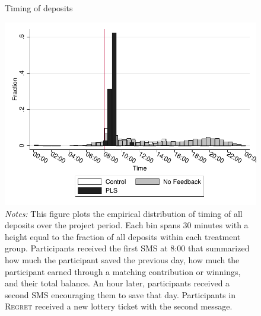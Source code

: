 \documentclass[11pt]{article}
\begin{document}
        \begin{figure}[ht]
        \centering
        \caption{Timing of deposits}
        \includegraphics[width=\textwidth]{../../figures/hist-deposits.pdf}
        \caption*{\footnotesize \emph{Notes:} This figure plots the empirical distribution of timing of all deposits over the project period. Each bin spans 30 minutes with a height equal to the fraction of all deposits within each treatment group. Participants received the first SMS at 8:00 that summarized how much the participant saved the previous day, how much the participant earned through a matching contribution or winnings, and their total balance. An hour later, participants received a second SMS encouraging them to save that day. Participants in \textsc{Regret} received a new lottery ticket with the second message.}
        \end{figure}
\end{document}
